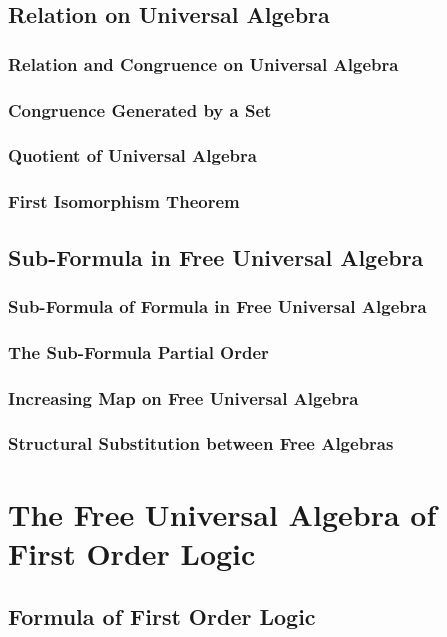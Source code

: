 \documentclass{report}
\begin{document}
\section{Relation on Universal Algebra}
    \subsection{Relation and Congruence on Universal Algebra}
      
    \subsection{Congruence Generated by a Set}
      
    \subsection{Quotient of Universal Algebra}
      
    \subsection{First Isomorphism Theorem}
      
\section{Sub-Formula in Free Universal Algebra}
    \subsection{Sub-Formula of Formula in Free Universal Algebra}
      
    \subsection{The Sub-Formula Partial Order}
      
    \subsection{Increasing Map on Free Universal Algebra}
      
    \subsection{Structural Substitution between Free Algebras}
      
\chapter{The Free Universal Algebra of First Order Logic}
\section{Formula of First Order Logic}
\end{document}

